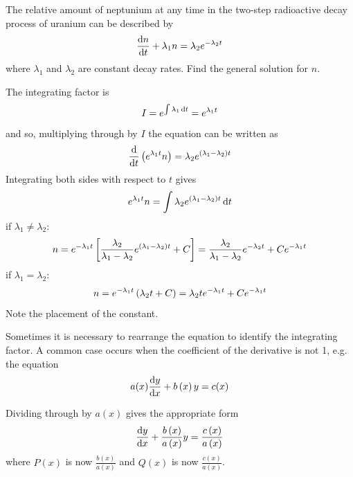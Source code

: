 \goodbreak
\begin{example}[Lecture]
\label{ex:651}

The relative amount of neptunium at any time in the two-step radioactive decay process of uranium can be described by
\[
\frac{{\rm d} n}{{\rm d} t}+{\lambda }_{1}n={\lambda }_{2}{e}^{-{\lambda }_{2}t}
\]
where ${\lambda }_{1}$ and ${\lambda }_{2}$ are constant decay rates. Find the general solution for $n$.
\end{example}
\begin{solution}

The integrating factor is
\[
I={e}^{\int {\lambda }_{1} \, {\rm d}t}={e}^{{\lambda }_{1}t}
\]
and so, multiplying through by $I$ the equation can be written as
\[
\frac{{\rm d} }{{\rm d} t}\left({e}^{{\lambda }_{1}t}n\right)={\lambda }_{2}{e}^{\left({\lambda }_{1}-{\lambda }_{2}\right)t}
\]
Integrating both sides with respect to $t$ gives
\[
{e}^{{\lambda }_{1}t}n=\int {\lambda }_{2}{e}^{\left({\lambda }_{1}-{\lambda }_{2}\right)t} \, {\rm d}t
\]
if ${\lambda }_{1}\neq {\lambda }_{2}$:
\[
n={e}^{-{\lambda }_{1}t}\left[\frac{{\lambda }_{2}}{{\lambda }_{1}-{\lambda }_{2}}{e}^{\left({\lambda }_{1}-{\lambda }_{2}\right)t}+C\right]=\frac{{\lambda }_{2}}{{\lambda }_{1}-{\lambda }_{2}}{e}^{-{\lambda }_{2}t}+C{e}^{-{\lambda }_{1}t}
\]
if ${\lambda }_{1}={\lambda }_{2}$:
\[
n={e}^{-{\lambda }_{1}t}\left({\lambda }_{2}t+C\right)={\lambda }_{2}t{e}^{-{\lambda }_{1}t}+C{e}^{-{\lambda }_{1}t}
\]
Note the placement of the constant.

\end{solution}


Sometimes it is necessary to rearrange the equation to identify the integrating factor. A common case occurs when the coefficient of the derivative is not 1, e.g. the equation
\[
a(x)\frac{{\rm d} y}{{\rm d} x}+b\left(x\right)y=c(x)
\]

Dividing through by $a(x)$ gives the appropriate form
\[
\frac{{\rm d} y}{{\rm d} x}+\frac{b\left(x\right)}{a\left(x\right)}y=\frac{c\left(x\right)}{a\left(x\right)}
\]
where $P(x)$ is now $\frac{b\left(x\right)}{a\left(x\right)}$ and $Q(x)$ is now $\frac{c\left(x\right)}{a\left(x\right)}$.


